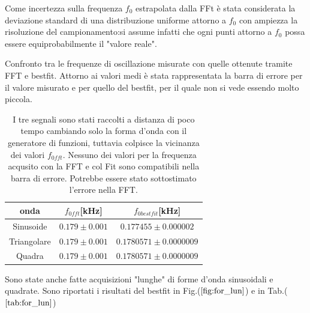 \documentclass{article}
\begin{document}
        Come incertezza sulla frequenza $f_0$ estrapolata dalla FFt è stata 
        considerata la deviazione standard di una distribuzione uniforme attorno
        a $f_0$ con ampiezza la risoluzione del campionamento:si assume infatti
         che ogni punti attorno a $f_0$ possa essere equiprobabilmente il "valore reale".  
         

        \begin{table}[H]
            \centering
            \caption{Confronto tra le frequenze di oscillazione misurate con quelle ottenute tramite FFT e bestfit.
                    Attorno ai valori medi è stata rappresentata la barra di errore per il valore
                    misurato e per quello del bestfit, per il quale non si vede essendo molto piccola.}
                \begin{tabular}{ccc}
                    onda            &   $f_{0fft}$[kHz]                     & $f_{0bestfit}$[kHz] \\
                    \hline
                    Sinusoide       &   $0.179 \pm 0.001$           & $0.177455 \pm 0.000002$ \\
                    Triangolare     &   $0.179 \pm 0.001$           & $0.1780571\pm 0.0000009$ \\
                    Quadra          &   $0.179 \pm 0.001$           & $0.1780571 \pm 0.0000009$ \\
                \end{tabular}
                \caption{I tre segnali sono stati raccolti a distanza di poco tempo
                        cambiando solo la forma d'onda con il generatore di funzioni,
                        tuttavia colpisce la vicinanza dei valori $f_{0fft}$.
                        Nessuno dei valori per la frequenza acqusito con la FFT
                        e col Fit sono compatibili nella barra di errore.
                        Potrebbe essere stato sottostimato l'errore nella FFT.}
                \label{tab:for_ond}
        \end{table}

        Sono state anche fatte acquisizioni "lunghe" di forme d'onda sinusoidali
         e quadrate. Sono riportati i risultati del bestfit in Fig.($\ref{fig:for_lun}$)
         e in Tab.($\ref{tab:for_lun}$)

         
\end{document}
